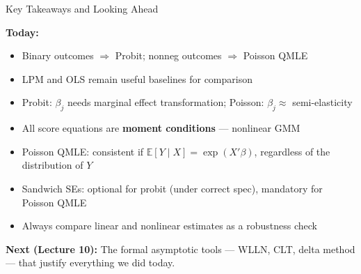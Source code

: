 \documentclass[aspectratio=169]{beamer}
\numberwithin{equation}{section}
\begin{document}
\begin{frame}{Key Takeaways and Looking Ahead}

\textbf{Today:}
\begin{itemize}
    \item Binary outcomes $\Rightarrow$ Probit; nonneg outcomes $\Rightarrow$ Poisson QMLE
    \item LPM and OLS remain useful baselines for comparison
    \item Probit: $\beta_j$ needs marginal effect transformation; Poisson: $\beta_j \approx$ semi-elasticity
    \item All score equations are \textbf{moment conditions} --- nonlinear GMM
    \item Poisson QMLE: consistent if $\mathbb{E}[Y \mid X] = \exp(X'\beta)$, regardless of the distribution of $Y$
    \item Sandwich SEs: optional for probit (under correct spec), \alert{mandatory} for Poisson QMLE
    \item Always compare linear and nonlinear estimates as a robustness check
\end{itemize}

\pause

\bigskip

\textbf{Next (Lecture 10):} The formal asymptotic tools --- WLLN, CLT, delta method --- that justify everything we did today.

\end{frame}
\end{document}
